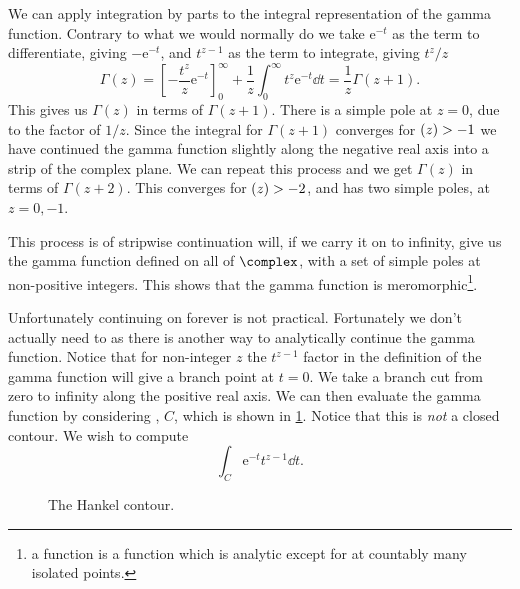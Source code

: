 \documentclass[fleqn]{NotesClass}
\newcommand*{\e}{\mathrm{e}}
\let\Re\relax
\let\Im\relax
\DeclareMathOperator{\Re}{Re}
\DeclareMathOperator{\Im}{Im}
\begin{document}
    We can apply integration by parts to the integral representation of the gamma function.
    Contrary to what we would normally do we take \(\e^{-t}\) as the term to differentiate, giving \(-\e^{-t}\), and \(t^{z - 1}\) as the term to integrate, giving \(t^{z}/z\)
    \begin{equation}
        \Gamma(z) = \left[ -\frac{t^{z}}{z} \e^{-t} \right]_{0}^{\infty} + \frac{1}{z}\int_{0}^{\infty} t^z\e^{-t} \dd{t} = \frac{1}{z}\Gamma(z + 1).
    \end{equation}
    This gives us \(\Gamma(z)\) in terms of \(\Gamma(z + 1)\).
    There is a simple pole at \(z = 0\), due to the factor of \(1/z\).
    Since the integral for \(\Gamma(z + 1)\) converges for \(\Re(z) > -1\) we have continued the gamma function slightly along the negative real axis into a strip of the complex plane.
    We can repeat this process and we get \(\Gamma(z)\) in terms of \(\Gamma(z + 2)\).
    This converges for \(\Re(z) > -2\), and has two simple poles, at \(z = 0, -1\).
    
    This process is of stripwise continuation will, if we carry it on to infinity, give us the gamma function defined on all of \(\complex\), with a set of simple poles at non-positive integers.
    This shows that the gamma function is meromorphic\footnote{a  function is a function which is analytic except for at countably many isolated points.}.
    
    Unfortunately continuing on forever is not practical.
    Fortunately we don't actually need to as there is another way to analytically continue the gamma function.
    Notice that for non-integer \(z\) the \(t^{z-1}\) factor in the definition of the gamma function will give a branch point at \(t = 0\).
    We take a branch cut from zero to infinity along the positive real axis.
    We can then evaluate the gamma function by considering , \(C\), which is shown in \cref{fig:hankel contour}.
    Notice that this is \emph{not} a closed contour.
    We wish to compute
    \begin{equation}
        \int_C \e^{-t}t^{z-1} \dd{t}.
    \end{equation}
    
    \begin{figure}
        \caption{The Hankel contour.}
        \label{fig:hankel contour}
    \end{figure}
    
\end{document}

